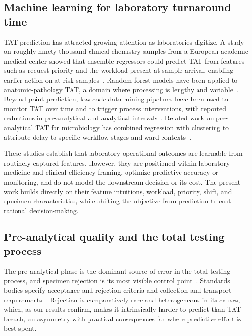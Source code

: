 \documentclass[journal]{IEEEtran}
\begin{document}
\subsection{Machine learning for laboratory turnaround time}
TAT prediction has attracted growing attention as laboratories digitize. A study
on roughly ninety thousand clinical-chemistry samples from a European academic
medical center showed that ensemble regressors could predict TAT from features
such as request priority and the workload present at sample arrival, enabling
earlier action on at-risk samples~\cite{tatml2022}. Random-forest models have been
applied to anatomic-pathology TAT, a domain where processing is lengthy and
variable~\cite{pathoml2026}. Beyond point prediction, low-code data-mining
pipelines have been used to monitor TAT over time and to trigger process
interventions, with reported reductions in pre-analytical and analytical
intervals~\cite{orange2026}. Related work on pre-analytical TAT for microbiology
has combined regression with clustering to attribute delay to specific workflow
stages and ward contexts~\cite{urinepretat2025}.

These studies establish that laboratory operational outcomes are learnable from
routinely captured features. However, they are positioned within
laboratory-medicine and clinical-efficiency framing, optimize predictive accuracy
or monitoring, and do not model the downstream decision or its cost. The present
work builds directly on their feature intuitions, workload, priority, shift, and
specimen characteristics, while shifting the objective from prediction to
cost-rational decision-making.

\subsection{Pre-analytical quality and the total testing process}
The pre-analytical phase is the dominant source of error in the total testing
process, and specimen rejection is its most visible control
point~\cite{plebani2010,hawkins2012}. Standards bodies specify acceptance and
rejection criteria and collection-and-transport requirements~\cite{clsi2021}.
Rejection is comparatively rare and heterogeneous in its causes, which, as our
results confirm, makes it intrinsically harder to predict than TAT breach, an
asymmetry with practical consequences for where predictive effort is best spent.
\end{document}
